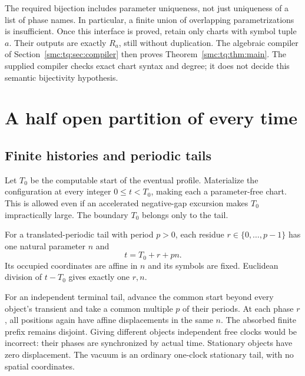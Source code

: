 \documentclass[11pt,letterpaper]{article}
\numberwithin{equation}{section}
\theoremstyle{definition}
\theoremstyle{remark}
\begin{document}
The required bijection includes parameter uniqueness, not just uniqueness
of a list of phase names. In particular, a finite union of overlapping
parametrizations is insufficient. Once this interface is proved, retain only
charts with symbol tuple $a$. Their outputs are exactly $R_a$, still without
duplication. The algebraic compiler of Section~\ref{smc:tq:sec:compiler} then proves
Theorem~\ref{smc:tq:thm:main}. The supplied compiler checks exact chart syntax and
degree; it does not decide this semantic bijectivity hypothesis.

\section{A half open partition of every time}\label{smc:tq:sec:partition}
\subsection{Finite histories and periodic tails}
Let $T_0$ be the computable start of the eventual profile. Materialize the
configuration at every integer $0\le t<T_0$, making each a parameter-free
chart. This is allowed even if an accelerated negative-gap excursion makes
$T_0$ impractically large. The boundary $T_0$ belongs only to the tail.

For a translated-periodic tail with period $p>0$, each residue
$r\in\{0,\ldots,p-1\}$ has one natural parameter $n$ and
\[
 t=T_0+r+pn.
\]
Its occupied coordinates are affine in $n$ and its symbols are fixed.
Euclidean division of $t-T_0$ gives exactly one $r,n$.

For an independent terminal tail, advance the common start beyond every
object's transient and take a common multiple $p$ of their periods. At each
phase $r$, all positions again have affine displacements in the same $n$.
The absorbed finite prefix remains disjoint. Giving different objects
independent free clocks would be incorrect: their phases are synchronized
by actual time. Stationary objects have zero displacement. The vacuum is an
ordinary one-clock stationary tail, with no spatial coordinates.
\end{document}
